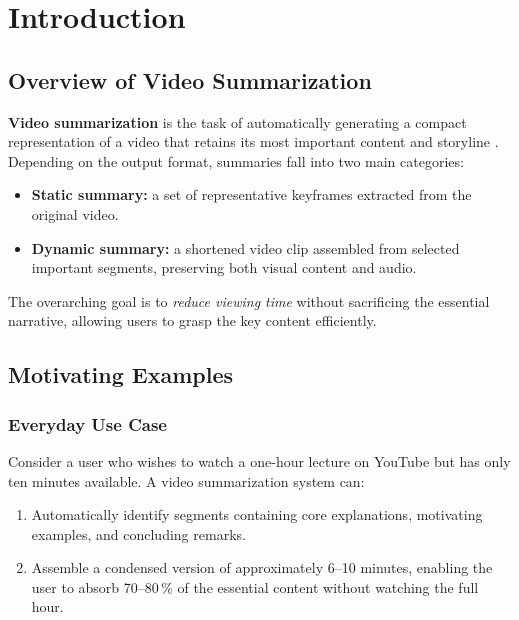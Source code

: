 \documentclass[12pt, a4paper]{report}
\begin{document}
\newpage

\tableofcontents
\newpage

\chapter{Introduction}

\section{Overview of Video Summarization}

\textbf{Video summarization} is the task of automatically generating a compact
representation of a video that retains its most important content and storyline
\cite{haq2021,money2015}. Depending on the output format, summaries fall into two
main categories:

\begin{itemize}[leftmargin=1.5cm]
  \item \textbf{Static summary:} a set of representative keyframes extracted from
        the original video.
  \item \textbf{Dynamic summary:} a shortened video clip assembled from selected
        important segments, preserving both visual content and audio.
\end{itemize}

The overarching goal is to \emph{reduce viewing time} without sacrificing the essential
narrative, allowing users to grasp the key content efficiently.

\section{Motivating Examples}

\subsection{Everyday Use Case}
Consider a user who wishes to watch a one-hour lecture on YouTube but has only ten
minutes available. A video summarization system can:
\begin{enumerate}
  \item Automatically identify segments containing core explanations, motivating
        examples, and concluding remarks.
  \item Assemble a condensed version of approximately 6--10 minutes, enabling the user
        to absorb 70--80\,\% of the essential content without watching the full hour.
\end{enumerate}
\end{document}
